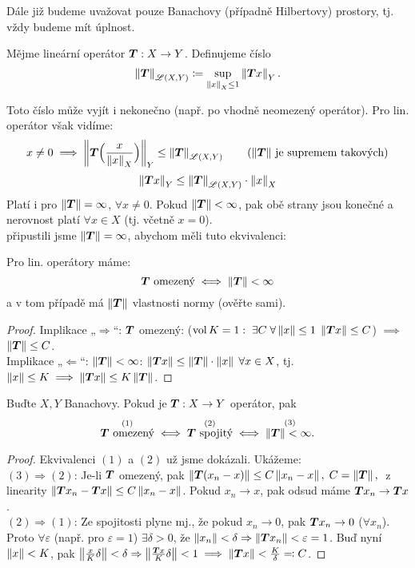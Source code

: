 Dále již budeme uvažovat pouze Banachovy (případně Hilbertovy) prostory, tj. vždy budeme mít úplnost.

\begin{definition}
\label{1.Norma operatoru}
Mějme lineární operátor $\boldsymbol{T}: X \to Y$. Definujeme číslo
$$
  \left\lVert\boldsymbol{T}\right\rVert_{\mathscr{L}(X, Y)} \coloneqq \underset{\left\lVert x\right\rVert_X \leq 1}{\sup} \left\lVert\boldsymbol{T}x\right\rVert_Y.
$$
\end{definition}
Toto číslo může vyjít i nekonečno (např. po vhodně neomezený operátor). Pro lin. operátor však vidíme:
$$
  x \neq 0 \implies
  \left\lVert\boldsymbol{T}\Big(\frac{x}{\left\lVert x\right\rVert_X}\Big)\right\rVert_Y \leq \left\lVert\boldsymbol{T}\right\rVert_{\mathscr{L}(X, Y)}
  \hspace{2em}
  \text{($\left\lVert\boldsymbol{T}\right\rVert$ je supremem takových)}
$$
$$
    \left\lVert\boldsymbol{T}x\right\rVert_Y \leq \left\lVert\boldsymbol{T}\right\rVert_{\mathscr{L}(X, Y)} \cdot \left\lVert x\right\rVert_X
$$
Platí i pro $\left\lVert\boldsymbol{T}\right\rVert = \infty$, $\forall x \neq 0$. Pokud $\left\lVert\boldsymbol{T}\right\rVert < \infty$, pak obě strany jsou konečné a  nerovnost platí $\forall x \in X$ (tj. včetně $x = 0$).
\\
\Poznamka připustili jsme $\left\lVert\boldsymbol{T}\right\rVert = \infty$, abychom měli tuto ekvivalenci:
\begin{lemma}
Pro lin. operátory máme:
$$
    \boldsymbol{T} \text{ omezený}
    \iff
    \left\lVert\boldsymbol{T}\right\rVert < \infty
$$
a v tom případě má $\left\lVert\boldsymbol{T}\right\rVert$ vlastnosti normy (ověřte sami).
\end{lemma}
\begin{proof}
Implikace „$\Rightarrow$“: $\boldsymbol{T}$ omezený: ($\operatorname{vol} K = 1: \; \exists C \; \forall \left\lVert x\right\rVert \leq 1 \; \left\lVert\boldsymbol{T}x\right\rVert \leq C$) $\implies$ $\left\lVert\boldsymbol{T}\right\rVert \leq C$.
\\[5pt]
Implikace „$\Leftarrow$“: $\left\lVert\boldsymbol{T}\right\rVert < \infty$: $\left\lVert\boldsymbol{T}x\right\rVert \leq \left\lVert\boldsymbol{T}\right\rVert \cdot \left\lVert x\right\rVert \; \forall x \in X$, tj. $\left\lVert x\right\rVert \leq K \implies \left\lVert\boldsymbol{T}x\right\rVert \leq K \left\lVert\boldsymbol{T}\right\rVert$.
\end{proof}

\begin{lemma}
Buďte $X,Y$ Banachovy. Pokud je $\boldsymbol{T}: X \to Y$  operátor, pak
$$
    \overset{(1)}{\boldsymbol{T} \text{ omezený}}
    \iff
    \overset{(2)}{\boldsymbol{T} \text{ spojitý}}
    \iff
    \overset{(3)}{\left\lVert\boldsymbol{T}\right\rVert < \infty.}
$$
\end{lemma}
\begin{proof}
Ekvivalenci $(1)$ a $(2)$ už jsme dokázali. Ukážeme:
\\[5pt]
$(3) \Rightarrow (2)$: Je-li $\boldsymbol{T}$ omezený, pak $\left\lVert\boldsymbol{T} (x_n - x)\right\rVert \leq C \left\lVert x_n - x\right\rVert, \; C = \left\lVert\boldsymbol{T}\right\rVert, \;$ z linearity $\left\lVert\boldsymbol{T}x_n - \boldsymbol{T}x\right\rVert \leq C \left\lVert x_n - x\right\rVert$. Pokud $x_n \to x$, pak odsud máme $\boldsymbol{T}x_n \to \boldsymbol{T}x$.
\\[5pt]
$(2) \Rightarrow (1)$: Ze spojitosti plyne mj., že pokud $x_n \to 0$, pak $\boldsymbol{T}x_n \to 0$ ($\forall x_n$). Proto $\forall \varepsilon$ (např. pro $\varepsilon = 1$) $\exists \delta>0$, že $\left\lVert x_n\right\rVert < \delta \Rightarrow \left\lVert\boldsymbol{T}x_n\right\rVert < \varepsilon = 1$. Buď nyní $\left\lVert x\right\rVert < K$, pak $\left\lVert\frac{x}{K} \delta\right\rVert < \delta \Rightarrow \left\lVert\frac{\boldsymbol{T}x}{K} \delta\right\rVert < 1 \implies \left\lVert\boldsymbol{T}x\right\rVert < \frac{K}{\delta} \eqqcolon C$.
\end{proof}

